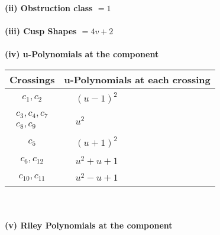 \documentclass[1p]{elsarticle_modified}
\theoremstyle{definition}
\begin{document}
\flushleft \textbf{(ii) Obstruction class $= 1$}\\~\\
\flushleft \textbf{(iii) Cusp Shapes $= 4 v+2$}\\~\\
\newpage\renewcommand{\arraystretch}{1}
\flushleft \textbf{(iv) u-Polynomials at the component}\newline \\
\begin{tabular}{m{50pt}|m{274pt}}
Crossings & \hspace{64pt}u-Polynomials at each crossing \\
\hline $$\begin{aligned}c_{1},c_{2}\end{aligned}$$&$\begin{aligned}
&(u-1)^2
\end{aligned}$\\
\hline $$\begin{aligned}c_{3},c_{4},c_{7}\\c_{8},c_{9}\end{aligned}$$&$\begin{aligned}
&u^2
\end{aligned}$\\
\hline $$\begin{aligned}c_{5}\end{aligned}$$&$\begin{aligned}
&(u+1)^2
\end{aligned}$\\
\hline $$\begin{aligned}c_{6},c_{12}\end{aligned}$$&$\begin{aligned}
&u^2+u+1
\end{aligned}$\\
\hline $$\begin{aligned}c_{10},c_{11}\end{aligned}$$&$\begin{aligned}
&u^2- u+1
\end{aligned}$\\
\hline
\end{tabular}\\~\\
\newpage\renewcommand{\arraystretch}{1}
\flushleft \textbf{(v) Riley Polynomials at the component}\newline \\
\end{document}
